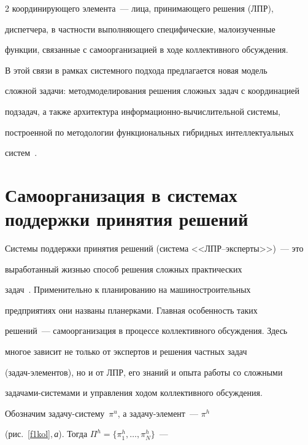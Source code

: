 \begin{multicols}{2}
координирующего элемента~--- лица, принимающего решения (ЛПР), 


диспетчера, в част\-ности выполняющего специфические, малоизученные 


функции, связанные с самоорганизацией в ходе коллективного обсуждения.


  


  В этой связи в рамках системного подхода предлагается новая модель 


сложной задачи: метод\linebreak моделирования решения сложных задач с координацией 


подзадач, а также архитектура ин\-фор\-ма\-ци\-он\-но-вычислительной системы, 


построенной по методологии функциональных гибридных интеллектуальных 


систем~\cite{8kol}.


  


\section{Самоорганизация в системах поддержки принятия решений}


  


  Системы поддержки принятия решений (система <<ЛПР--эксперты>>)~--- это 


выработанный жизнью способ решения сложных практических 


задач~\cite{8kol}. Применительно к планированию на машиностроительных 


предприятиях они названы планерками. Главная особенность таких 


  решений~--- самоорганизация в процессе коллективного обсуждения. Здесь 


многое зависит не только от экспертов и решения частных задач 


  (за\-дач-эле\-мен\-тов), но и от ЛПР, его знаний и опыта работы со сложными 


за\-да\-ча\-ми-сис\-те\-ма\-ми и управления ходом коллективного обсуждения.


  


  Обозначим задачу-систему~$\pi^u$, а за\-да\-чу-эле\-мент~--- $\pi^h$ 


(рис.~\ref{f1kol},\,\textit{а}). Тогда $\Pi^h =\{\pi^h_1, \ldots , \pi^h_N\}$~--- 



\end{multicols}
